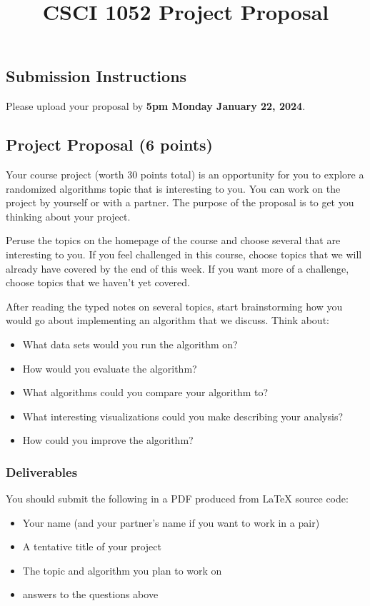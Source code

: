 \documentclass{article}
\title{CSCI 1052 Project Proposal}
\author{} %
\date{}
\begin{document}
\maketitle

\subsection*{Submission Instructions}
Please upload your proposal by \textbf{5pm Monday January 22, 2024}.

\subsection*{Project Proposal (6 points)}

Your course project (worth 30 points total) is an opportunity
for you to explore a randomized algorithms topic that is
interesting to you.
You can work on the project by yourself or with a partner.
The purpose of the proposal is to get you thinking 
about your project.

Peruse the topics on the homepage of the course and choose several that are interesting to you.
If you feel challenged in this course, choose topics that we will already have covered by the end of this week.
If you want more of a challenge, choose topics that we haven't yet covered.

After reading the typed notes on several topics, start brainstorming how you would go about implementing an algorithm that we discuss.
Think about:
\begin{itemize}
    \item What data sets would you run the algorithm on?
    \item How would you evaluate the algorithm?
    \item What algorithms could you compare your algorithm to?
    \item What interesting visualizations could you make describing your analysis?
    \item How could you improve the algorithm?
\end{itemize}

\subsubsection*{Deliverables}

You should submit the following in a PDF produced from
LaTeX source code:
\begin{itemize}
    \item Your name (and your partner's name if you want to work in a pair)
    \item A tentative title of your project
    \item The topic and algorithm you plan to work on
    \item answers to the questions above 
\end{itemize}
\end{document}

